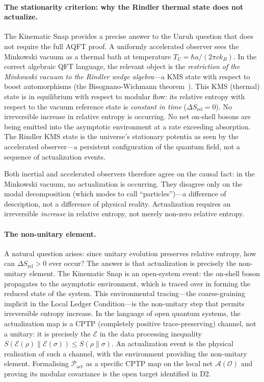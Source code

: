 \documentclass[11pt,a4paper]{article}
\theoremstyle{plain}
\theoremstyle{definition}
\theoremstyle{remark}
\newcommand{\Pact}{\mathcal{P}_{\mathrm{act}}}
\begin{document}
\paragraph{The stationarity criterion: why the Rindler thermal state does not actualize.}
The Kinematic Snap provides a precise answer to the Unruh question that does not
require the full AQFT proof. A uniformly accelerated observer sees the Minkowski
vacuum as a thermal bath at temperature $T_U = \hbar a / (2\pi c k_B)$. In the
correct algebraic QFT language, the relevant object is the \emph{restriction of
the Minkowski vacuum to the Rindler wedge algebra}---a KMS state with respect to
boost automorphisms (the Bisognano-Wichmann theorem~\citep{BisognanoWichmann1975}).
This KMS (thermal) state is in equilibrium with respect to modular flow: its
relative entropy with respect to the vacuum reference state is
\emph{constant in time} ($\Delta S_{\mathrm{rel}} = 0$).
No irreversible increase in relative entropy is occurring. No net on-shell bosons
are being emitted into the asymptotic environment at a rate exceeding absorption.
The Rindler KMS state is the universe's stationary potentia as seen by the
accelerated observer---a persistent configuration of the quantum field, not a
sequence of actualization events.

Both inertial and accelerated observers therefore agree on the causal fact: in the
Minkowski vacuum, no actualization is occurring. They disagree only on the modal
decomposition (which modes to call ``particles'')---a difference of description,
not a difference of physical reality. Actualization requires an irreversible
\emph{increase} in relative entropy, not merely non-zero relative entropy.

\paragraph{The non-unitary element.}
A natural question arises: since unitary evolution preserves relative entropy,
how can $\Delta S_{\mathrm{rel}} > 0$ ever occur? The answer is that actualization
is precisely the non-unitary element. The Kinematic Snap is an open-system event:
the on-shell boson propagates to the asymptotic environment, which is traced over
in forming the reduced state of the system. This environmental tracing---the
coarse-graining implicit in the Local Ledger Condition---is the non-unitary
step that permits irreversible entropy increase. In the language of open quantum
systems, the actualization map is a CPTP (completely positive trace-preserving)
channel, not a unitary: it is precisely the $\mathcal{E}$ in the data processing
inequality $S(\mathcal{E}(\rho) \| \mathcal{E}(\sigma)) \leq S(\rho \| \sigma)$.
An actualization event is the physical realisation of such a channel, with the
environment providing the non-unitary element. Formalising $\Pact$ as a specific
CPTP map on the local net $\mathcal{A}(\mathcal{O})$ and proving its modular
covariance is the open target identified in D2.
\end{document}
